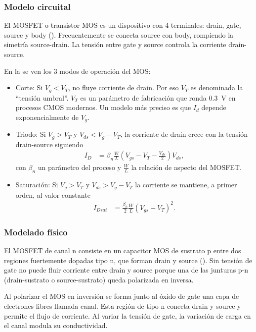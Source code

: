 \subsubsection{Modelo circuital}
\label{section:ecuaciones_mos}
El MOSFET o transistor MOS es un dispositivo con 4 terminales:
drain, gate, source y body ().
Frecuentemente se conecta source con body, rompiendo la simetría source-drain.
La tensión entre gate y source controla la corriente drain-source.

En la  se ven los 3 modos de operación del MOS:
\begin{itemize}
    \item Corte: Si $V_g<V_T$, no fluye corriente de drain.
        Por eso $V_T$ es denominada la ``tensión umbral''.
        $V_T$ es un parámetro de fabricación que ronda \SI{.3}{\volt} en procesos CMOS
        modernos.
        Un modelo más preciso es que $I_d$ depende exponencialmente de $V_g$.
    \item Triodo: Si $V_g>V_T$ y $V_{ds}<V_g-V_T$, la corriente de drain crece con la
        tensión drain-source siguiendo
        \begin{align*}
            I_D&=\beta_n\frac WL(V_{gs}-V_T-\frac{V_{ds}}2)V_{ds},
        \end{align*}
        con $\beta_n$ un parámetro del proceso y $\frac WL$ la relación de
        aspecto del MOSFET.
    \item Saturación: Si $V_g>V_T$ y $V_{ds}>V_g-V_T$ la corriente se mantiene, a primer
        orden, al valor constante
        \begin{align*}
            I_{Dsat}&=\frac{\beta_n}2\frac WL(V_{gs}-V_T)^2.
        \end{align*}
\end{itemize}
%
\subsubsection{Modelado físico}
El MOSFET de canal n consiste en un capacitor MOS de sustrato p entre dos regiones fuertemente dopadas 
tipo n, 
que forman drain y source ().
Sin tensión de gate no puede fluir corriente entre drain y source porque una de las
junturas p-n (drain-sustrato o source-sustrato) queda polarizada en inversa.

Al polarizar el MOS en inversión se forma junto al óxido de gate 
una capa de electrones libres llamada canal.
Esta región de tipo n conecta drain y source y permite el flujo de corriente.
Al variar la tensión de gate, la variación de carga en el canal modula su
conductividad.
